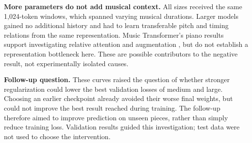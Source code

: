 \textbf{More parameters do not add musical context.} All sizes received the same 1,024-token windows, which spanned varying musical durations. Larger models gained no additional history and had to learn transferable pitch and timing relations from the same representation. Music Transformer's piano results support investigating relative attention and augmentation \citep{huang2019musictransformer}, but do not establish a representation bottleneck here. These are possible contributors to the negative result, not experimentally isolated causes.

\textbf{Follow-up question.} These curves raised the question of whether stronger regularization could lower the best validation losses of medium and large. Choosing an earlier checkpoint already avoided their worse final weights, but could not improve the best result reached during training. The follow-up therefore aimed to improve prediction on unseen pieces, rather than simply reduce training loss. Validation results guided this investigation; test data were not used to choose the intervention.
